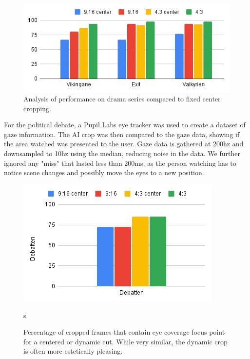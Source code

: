 \documentclass[sigconf, review=true]{acmart}
\begin{document}
\begin{figure}
\begin{center}
\includegraphics[width=0.9\columnwidth]{generic_ai_comparison.png}
\caption{Analysis of performance on drama series compared to fixed center
 cropping.}
\label{generic_ai_comparison}
\end{center}
\end{figure}

For the political debate, a Pupil Labs eye tracker was used to create a
dataset of gaze information. The AI crop was then compared to the gaze data,
showing if the area watched was presented to the user. Gaze data is gathered
at 200hz and downsampled to 10hz using the median, reducing noise in the
data. We further ignored any "miss" that lasted less than 200ms, as the
person watching has to notice scene changes and possibly move the eyes to a
new position. 

\begin{figure}
\begin{center}
\includegraphics[width=1\columnwidth]{CoverageOfEyeTracking.png}
\caption{Percentage of cropped frames that contain eye coverage focus point
 for a centered or dynamic cut. While very similar, the dynamic crop is often
 more estetically pleasing.}s
\label{debatten_plot}
 \end{center}
\end{figure}
\end{document}
